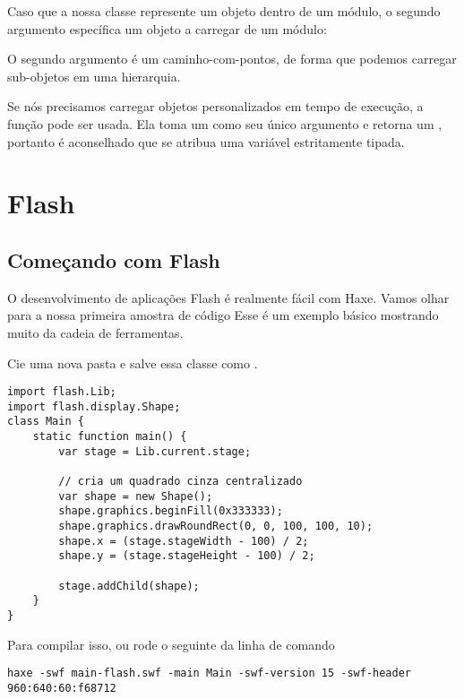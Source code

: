 
Caso que a nossa classe  represente um objeto dentro de um módulo, o segundo argumento específica um objeto a carregar de um módulo: 


O segundo argumento é um caminho-com-pontos, de forma que podemos carregar sub-objetos em uma hierarquia.

Se nós precisamos carregar objetos personalizados em tempo de execução, a função  pode ser usada. Ela toma um  como seu único argumento e retorna um , portanto é aconselhado que se atribua uma variável estritamente tipada.

\section{Flash}
\label{target-flash}

\subsection{Começando com Flash}
\label{target-flash-getting-started}

O desenvolvimento de aplicações Flash é realmente fácil com Haxe. Vamos olhar para a nossa primeira amostra de código
Esse é um exemplo básico mostrando muito da cadeia de ferramentas.

Cie uma nova pasta e salve essa classe como .

\begin{lstlisting}
import flash.Lib;
import flash.display.Shape;
class Main {
    static function main() {
        var stage = Lib.current.stage;
        
        // cria um quadrado cinza centralizado 
        var shape = new Shape();
        shape.graphics.beginFill(0x333333);
		shape.graphics.drawRoundRect(0, 0, 100, 100, 10);
		shape.x = (stage.stageWidth - 100) / 2;
		shape.y = (stage.stageHeight - 100) / 2;
		
		stage.addChild(shape);
    }    
}
\end{lstlisting}

Para compilar isso, ou rode o seguinte da linha de comando

\begin{lstlisting}
haxe -swf main-flash.swf -main Main -swf-version 15 -swf-header 960:640:60:f68712
\end{lstlisting}

